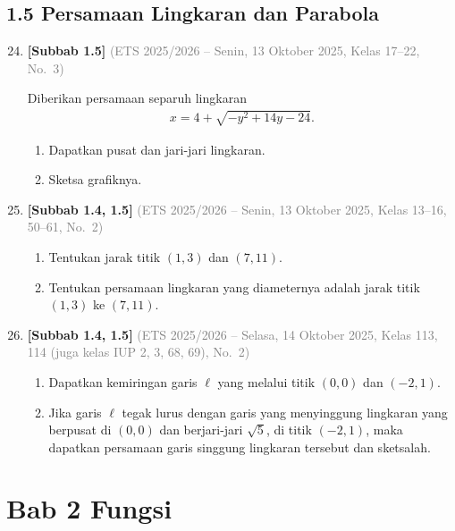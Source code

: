 \documentclass[10pt,openany,a4paper]{article}
\theoremstyle{definition}
\theoremstyle{definition}
\theoremstyle{plain}
\begin{document}
\subsection*{1.5 \quad Persamaan Lingkaran dan Parabola}
\begin{enumerate}
\setcounter{enumi}{23}
    \item \textbf{[Subbab 1.5]} {\footnotesize\textcolor{gray}{(ETS 2025/2026 -- Senin, 13 Oktober 2025, Kelas 17--22, No.~3)}}\par
    Diberikan persamaan separuh lingkaran
    \begin{align*}
       x=4+\sqrt{-y^2+14y-24}.
    \end{align*}
    \begin{enumerate}
        \item Dapatkan pusat dan jari-jari lingkaran.
        \item Sketsa grafiknya.
    \end{enumerate}

    \item \textbf{[Subbab 1.4, 1.5]} {\footnotesize\textcolor{gray}{(ETS 2025/2026 -- Senin, 13 Oktober 2025, Kelas 13--16, 50--61, No.~2)}}\par
    \begin{enumerate}
        \item Tentukan jarak titik $(1,3)$ dan $(7,11)$.
        \item Tentukan persamaan lingkaran yang diameternya adalah jarak titik $(1,3)$ ke $(7,11)$.
    \end{enumerate}

    \item \textbf{[Subbab 1.4, 1.5]} {\footnotesize\textcolor{gray}{(ETS 2025/2026 -- Selasa, 14 Oktober 2025, Kelas 113, 114 (juga kelas IUP 2, 3, 68, 69), No.~2)}}\par
    \begin{enumerate}
        \item Dapatkan kemiringan garis $\ell$ yang melalui titik $(0,0)$ dan $(-2,1)$.
        \item Jika garis $\ell$ tegak lurus dengan garis yang menyinggung lingkaran yang berpusat di $(0,0)$ dan berjari-jari $\sqrt{5}$, di titik $(-2,1)$, maka dapatkan persamaan garis singgung lingkaran tersebut dan sketsalah.
    \end{enumerate}

\end{enumerate}
\newpage

\section*{Bab 2 \quad Fungsi}
\end{document}

